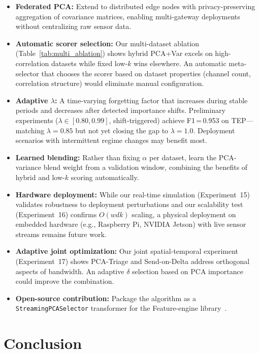 \documentclass[journal]{IEEEtran}
\begin{document}
\begin{itemize}[leftmargin=*]
\item \textbf{Federated PCA:} Extend to distributed edge nodes with privacy-preserving aggregation of covariance matrices, enabling multi-gateway deployments without centralizing raw sensor data.
\item \textbf{Automatic scorer selection:} Our multi-dataset ablation (Table~\ref{tab:multi_ablation}) shows hybrid PCA+Var excels on high-correlation datasets while fixed low-$k$ wins elsewhere. An automatic meta-selector that chooses the scorer based on dataset properties (channel count, correlation structure) would eliminate manual configuration.
\item \textbf{Adaptive $\lambda$:} A time-varying forgetting factor that increases during stable periods and decreases after detected importance shifts. Preliminary experiments ($\lambda \in [0.80, 0.99]$, shift-triggered) achieve F1\,=\,0.953 on TEP---matching $\lambda{=}0.85$ but not yet closing the gap to $\lambda{=}1.0$. Deployment scenarios with intermittent regime changes may benefit most.
\item \textbf{Learned blending:} Rather than fixing $\alpha$ per dataset, learn the PCA-variance blend weight from a validation window, combining the benefits of hybrid and low-$k$ scoring automatically.
\item \textbf{Hardware deployment:} While our real-time simulation (Experiment~15) validates robustness to deployment perturbations and our scalability test (Experiment~16) confirms $O(wdk)$ scaling, a physical deployment on embedded hardware (e.g., Raspberry Pi, NVIDIA Jetson) with live sensor streams remains future work.
\item \textbf{Adaptive joint optimization:} Our joint spatial-temporal experiment (Experiment~17) shows PCA-Triage and Send-on-Delta address orthogonal aspects of bandwidth. An adaptive $\delta$ selection based on PCA importance could improve the combination.
\item \textbf{Open-source contribution:} Package the algorithm as a \texttt{StreamingPCASelector} transformer for the Feature-engine library~\cite{galli2022feature}.
\end{itemize}

\section{Conclusion}
\label{sec:conclusion}
\end{document}
